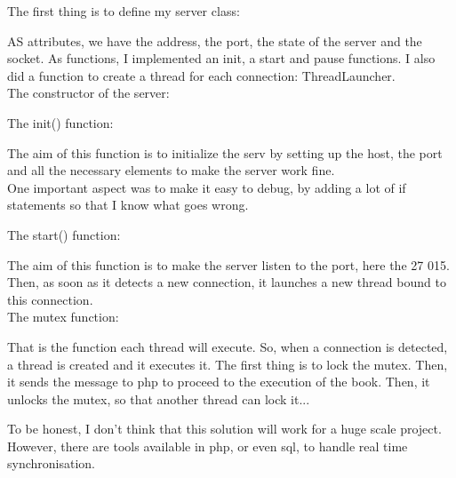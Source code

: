 \documentclass[12pt,a4paper,openany]{book}
\begin{document}
The first thing is to define my server class:

\bigskip
AS attributes, we have the address, the port, the state of the server and the socket. As functions, I implemented an init, a start and pause functions. I also did a function to create a thread for each connection: ThreadLauncher.\\

The constructor of the server:

\bigskip

The init() function:

\bigskip
The aim of this function is to initialize the serv by setting up the host, the port and all the necessary elements to make the server work fine.\\

One important aspect was to make it easy to debug, by adding a lot of if statements so that I know what goes wrong.

The start() function:

\bigskip
The aim of this function is to make the server listen to the port, here the 27 015. Then, as soon as it detects a new connection, it launches a new thread bound to this connection.\\

The mutex function:

\bigskip
That is the function each thread will execute. So, when a connection is detected, a thread is created and it executes it. The first thing is to lock the mutex. Then, it sends the message to php to proceed to the execution of the book. Then, it unlocks the mutex, so that another thread can lock it...

\begin{remarque}
	To be honest, I don't think that this solution will work for a huge scale project. However, there are tools available in php, or even sql, to handle real time synchronisation.
\end{remarque}
\end{document}
